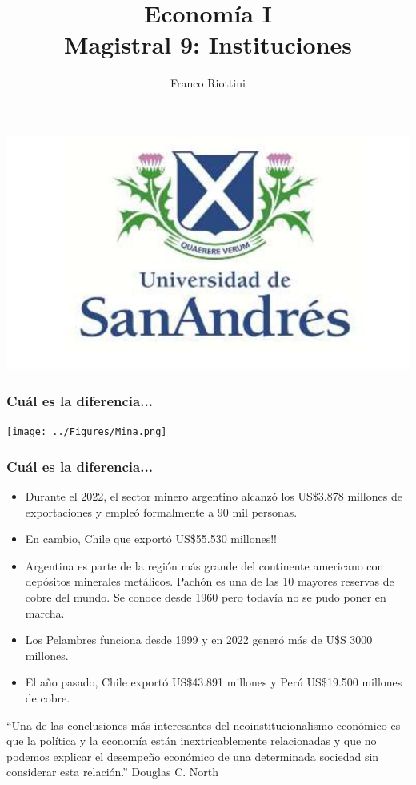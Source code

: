 \documentclass{beamer}
\title[Economía I]{Economía I \vspace{4mm}
\\ Magistral 9: Instituciones}
\date{}
\author[Riottini]{Franco Riottini}
\institute[]{Universidad de San Andrés}
\begin{document}
\begin{frame}
\titlepage
\centering
\includegraphics[scale=0.2]{../Figures/logoUDESA.jpg} 
\end{frame}


\begin{frame}
\frametitle{Cuál es la diferencia...}
\centering
\texttt{[image: ../Figures/Mina.png]}
\end{frame}

\begin{frame}
\frametitle{Cuál es la diferencia...}
\begin{itemize}
    \item Durante el 2022, el sector minero argentino alcanzó los US\$3.878 millones de exportaciones y empleó formalmente a 90 mil personas.
    \item En cambio, Chile que exportó US\$55.530 millones!!
    \item  Argentina es parte de la región más grande del continente americano con depósitos minerales metálicos. Pachón es una de las 10 mayores reservas de cobre del mundo. Se conoce desde 1960 pero todavía no se pudo poner en marcha.
    \item Los Pelambres funciona desde 1999 y en 2022 generó más de U\$S 3000 millones.
    \item  El año pasado, Chile exportó US\$43.891 millones y Perú US\$19.500 millones de cobre. 
\end{itemize}
\end{frame}



\begin{frame}
\centering
“Una de las conclusiones más interesantes del neoinstitucionalismo económico es que la política y la economía están inextricablemente relacionadas y que no podemos explicar el desempeño económico de una determinada sociedad sin considerar esta relación.” Douglas C. North
\end{frame}
\end{document}
